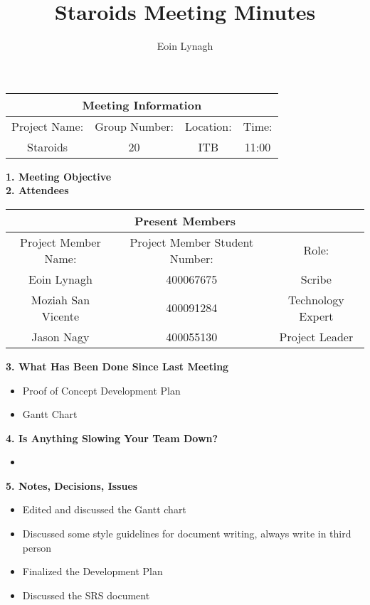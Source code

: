 \documentclass[12pt]{article}
\title{Staroids Meeting Minutes}
\author{Eoin Lynagh}
\begin{document}
\maketitle
\begin{center}
 \begin{tabular}{| c | c | c |  c |}
 \hline
 \multicolumn{4}{|c|}{Meeting Information} \\
\hline
 Project Name: & Group Number: & Location: & Time: \\
 \hline
 Staroids & 20 & ITB & 11:00 \\
\hline
\end{tabular}
\end{center}
\begin{flushleft}


\textbf{1. Meeting Objective}\\


\textbf{2. Attendees}\\
\begin{center}
 \begin{tabular}{|c | c | c | }
 \hline
 \multicolumn{3}{|c|}{Present Members} \\
\hline
 Project Member Name: & Project Member Student Number: & Role: \\
 \hline\hline
 Eoin Lynagh & 400067675 & Scribe \\
\hline
Moziah San Vicente & 400091284 & Technology Expert \\
\hline
 Jason Nagy & 400055130 & Project Leader \\
\hline
\end{tabular}
\end{center}

\textbf{3. What Has Been Done Since Last Meeting}\\
\begin{itemize}
\item Proof of Concept Development Plan
\item Gantt Chart
\end{itemize}

\textbf{4. Is Anything Slowing Your Team Down?}\\
\begin{itemize}
\item
\end{itemize}

\textbf{5. Notes, Decisions, Issues}\\
\begin{itemize}
\item Edited and discussed the Gantt chart\\
\item Discussed some style guidelines for document writing, always write in third person\\
\item Finalized the Development Plan\\
\item Discussed the SRS document\\
\end{itemize}



\end{flushleft}
\end{document}
